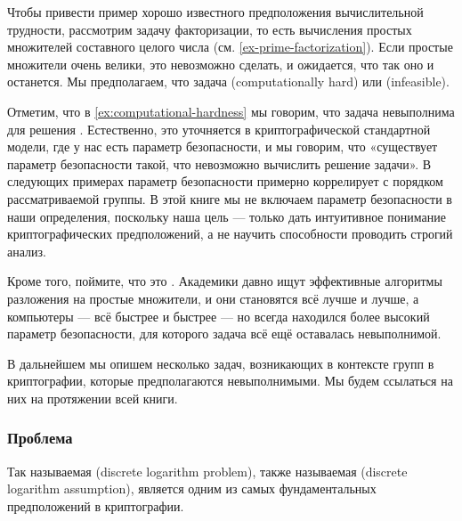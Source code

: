 \begin{example}\label{ex:computational-hardness}

Чтобы привести пример хорошо известного предположения вычислительной трудности, рассмотрим задачу факторизации, то есть вычисления простых множителей составного целого числа (см. \examplename{} \ref{ex-prime-factorization}). Если простые множители очень велики, это невозможно сделать, и ожидается, что так оно и останется. Мы предполагаем, что задача  (computationally hard) или  (infeasible).

\end{example}

Отметим, что в \examplename{} \ref{ex:computational-hardness} {мы говорим, что} задача невыполнима для решения . Естественно, это уточняется в криптографической стандартной модели, где у нас есть параметр безопасности, и мы говорим, что «существует параметр безопасности такой, что невозможно вычислить решение задачи». В следующих примерах параметр безопасности примерно коррелирует с порядком рассматриваемой группы. В этой книге мы не включаем параметр безопасности в наши определения, поскольку наша цель — только дать интуитивное понимание криптографических предположений, а не научить способности проводить строгий анализ.

Кроме того, поймите, что это . Академики давно ищут эффективные алгоритмы разложения на простые множители, и они становятся всё лучше и лучше, а компьютеры — всё быстрее и быстрее — но всегда находился более высокий параметр безопасности, для которого задача всё ещё оставалась невыполнимой.%

В дальнейшем мы опишем несколько задач, возникающих в контексте групп в криптографии, которые предполагаются невыполнимыми. Мы будем ссылаться на них на протяжении всей книги.


\subsubsection{Проблема }
\label{def:DL-secure}
Так называемая  (discrete logarithm problem), также называемая  (discrete logarithm assumption), является одним из самых фундаментальных предположений в криптографии. 

